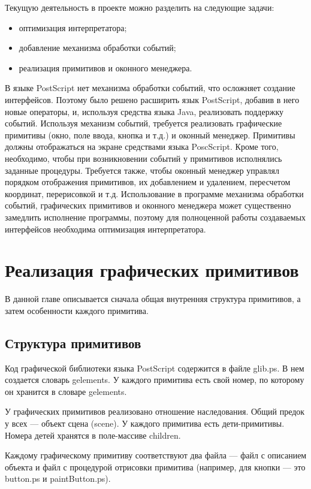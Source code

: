 \documentclass[14pt]{extarticle}
\begin{document}
		Текущую деятельность в проекте можно разделить на следующие задачи:
		\begin{itemize}
		\item оптимизация интерпретатора;
		\item добавление механизма обработки событий;
		\item реализация примитивов и оконного менеджера.
		\end{itemize}	
	
	В языке PostScript нет механизма обработки событий, что осложняет создание интерфейсов. Поэтому было решено расширить язык PostScript, добавив в него новые операторы, и, используя средства языка Java, реализовать поддержку событий. Используя механизм событий, требуется реализовать графические примитивы (окно, поле ввода, кнопка и т.д.) и оконный менеджер. Примитивы должны отображаться на экране средствами языка PoscScript. Кроме того, необходимо, чтобы при возникновении событий у примитивов исполнялись заданные процедуры. Требуется также, чтобы оконный менеджер управлял порядком отображения примитивов, их добавлением и удалением, пересчетом координат, перерисовкой и т.д. Использование в программе механизма обработки событий, графических примитивов и оконного менеджера может существенно замедлить исполнение программы, поэтому для полноценной работы создаваемых интерфейсов необходима оптимизация интерпретатора.
	\pagebreak
	\section{Реализация графических примитивов}
	В данной главе описывается сначала общая внутренняя структура примитивов, а затем особенности каждого примитива.
	\subsection{Структура примитивов}
		Код графической библиотеки языка PostScript содержится в файле  glib.ps. В нем создается словарь gelements. У каждого примитива есть свой номер, по которому он хранится в словаре gelements. 
		
		У графических примитивов реализовано отношение наследования. Общий предок у всех --- объект сцена (scene). У каждого примитива есть дети-примитивы. Номера детей хранятся в поле-массиве children.
		
		Каждому графическому примитиву соответствуют два файла --- файл с описанием объекта и файл с процедурой отрисовки примитива (например, для кнопки --- это button.ps и paintButton.ps). 
		
\end{document}
